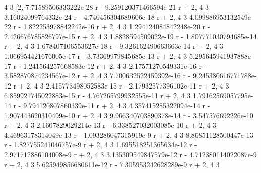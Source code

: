 \documentclass[12pt,arial,letterpaper]{book}
\begin{document}
\begin{eulercomment}
\begin{eulercomment}
\begin{eulercomment}
\begin{eulercomment}
\begin{eulercomment}
\begin{eulercomment}
\begin{eulercomment}
\begin{eulercomment}
\begin{eulercomment}
\begin{eulercomment}
\begin{eulercomment}
\begin{eulercomment}
\begin{eulercomment}
\begin{eulercomment}
\begin{eulercomment}
\begin{eulercomment}
\begin{eulercomment}
\begin{eulercomment}
\begin{eulercomment}
\begin{eulercomment}
\begin{eulercomment}
\begin{eulercomment}
\begin{euleroutput}
                                    4                          3
          [2, 7.71589506333222e-28 r  - 9.259120371466594e-21 r  + 2, 
                        4                          3
  3.16024099764332e-24 r  - 4.740456304689606e-18 r  + 2, 
                         4                          3
  4.099886953132549e-22 r  - 1.822253978842242e-16 r  + 2, 
                         4                          3
  1.294124084842248e-20 r  - 2.426676785826797e-15 r  + 2, 
                       4                          3
  1.8828594509022e-19 r  - 1.807771030794685e-14 r  + 2, 
                         4                          3
  1.678407106553627e-18 r  - 9.326162490663663e-14 r  + 2, 
                         4                         3
  1.066954421676005e-17 r  - 3.73369979845685e-13 r  + 2, 
                         4                          3
  5.295645941937888e-17 r  - 1.241564257668583e-12 r  + 2, 
                        4                          3
  2.17571270549331e-16 r  - 3.582870874234567e-12 r  + 2, 
                         4                          3
  7.700632522459392e-16 r  - 9.245380616771788e-12 r  + 2, 
                         4                         3
  2.415773498052583e-15 r  - 2.17932577396102e-11 r  + 2, 
                         4                          3
  6.859921745022883e-15 r  - 4.767265799932555e-11 r  + 2, 
                        4                          3
  1.79162569057795e-14 r  - 9.794120807860339e-11 r  + 2, 
                         4                          3
  4.357415285322094e-14 r  - 1.907443620310499e-10 r  + 2, 
                         4                       3
  9.966340703890378e-14 r  - 3.547576692226e-10 r  + 2, 
                       4                          3
  2.1607829029214e-13 r  - 6.338527032003085e-10 r  + 2, 
                        4                         3
  4.46963178314049e-13 r  - 1.093286047315919e-9 r  + 2, 
                        4                         3
  8.86851128500447e-13 r  - 1.827755241046757e-9 r  + 2, 
                         4                         3
  1.695518251365634e-12 r  - 2.971712886104008e-9 r  + 2, 
                         4                         3
  3.135309549847579e-12 r  - 4.712380114022087e-9 r  + 2, 
                         4                         3
  5.625949856680611e-12 r  - 7.305953242628289e-9 r  + 2, 
                         4                        3

\end{euleroutput}
\end{eulercomment}
\end{eulercomment}
\end{eulercomment}
\end{eulercomment}
\end{eulercomment}
\end{eulercomment}
\end{eulercomment}
\end{eulercomment}
\end{eulercomment}
\end{eulercomment}
\end{eulercomment}
\end{eulercomment}
\end{eulercomment}
\end{eulercomment}
\end{eulercomment}
\end{eulercomment}
\end{eulercomment}
\end{eulercomment}
\end{eulercomment}
\end{eulercomment}
\end{eulercomment}
\end{eulercomment}
\end{document}
